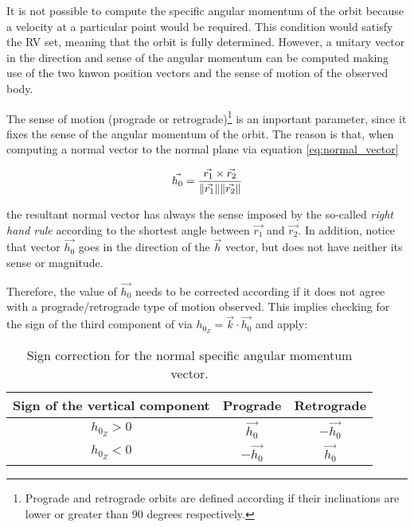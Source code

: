 It is not possible to compute the specific angular momentum of the orbit because
a velocity at a particular point would be required. This condition would satisfy
the RV set, meaning that the orbit is fully determined. However, a unitary
vector in the direction and sense of the angular momentum can be computed making
use of the two knwon position vectors and the sense of motion of the observed
body.

The sense of motion (prograde or retrograde)\footnote{Prograde and
retrograde orbits are defined according if their inclinations are lower or
greater than $90$ degrees respectively.} is an important parameter, since it
fixes the sense of the angular momentum of the orbit. The reason is that, when
computing a normal vector to the normal plane via equation
\ref{eq:normal_vector}

\begin{equation}
  \vec{h_{0}} = \frac{\vec{r_{1}} \times \vec{r_{2}}}{\lVert\vec{r_{1}}\rVert\lVert\vec{r_{2}}\rVert}
  \label{eq:normal_vector}
\end{equation}

the resultant normal vector has always the sense imposed by the so-called
\textit{right hand rule} according to the shortest angle between $\vec{r_{1}}$
and $\vec{r_{2}}$. In addition, notice that vector $\vec{h_{0}}$ goes in the
direction of the $\vec{h}$ vector, but does not have neither its sense or
magnitude.

Therefore, the value of $\vec{h_{0}}$ needs to be corrected according if it does
not agree with a prograde/retrograde type of motion observed. This implies
checking for the sign of the third component of via $h_{0_{Z}} =
  \vec{k} \cdot \vec{h_{0}}$ and apply:

\vspace{0.15cm}
\bgroup
\def\arraystretch{1.5}
\begin{table}[H]
  \centering
  \begin{tabular}{|c|c|c|}
    \hline
    \textbf{Sign of the vertical component} & \textbf{Prograde} & \textbf{Retrograde} \\ \hline
    $h_{0_{Z}} > 0$                         & $\vec{h_{0}}$     & $-\vec{h_{0}}$      \\ \hline
    $h_{0_{Z}} < 0$                         & $-\vec{h_{0}}$    & $\vec{h_{0}}$       \\ \hline
  \end{tabular}
  \caption{Sign correction for the normal specific angular momentum vector.}
\end{table}
\egroup

